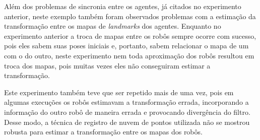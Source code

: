 Além dos problemas de sincronia entre os agentes, já citados no experimento 
anterior, neste exemplo também foram observados problemas com a estimação 
da transformação entre os mapas de \textit{landmarks} dos agentes. 
Enquanto no experimento anterior a troca de mapas entre os robôs sempre 
ocorre com sucesso, pois eles sabem suas poses iniciais e, portanto, sabem 
relacionar o mapa de um com o do outro, neste experimento nem toda aproximação dos 
robôs resultou em troca dos mapas, pois muitas vezes eles não conseguiram 
estimar a transformação.

Este experimento também teve que ser repetido mais de uma vez, pois em 
algumas execuções os robôs estimavam a transformação errada, incorporando 
a informação do outro robô de maneira errada e provocando divergência do 
filtro. Desse modo, a técnica de registro de nuvem de pontos utilizada 
não se mostrou robusta para estimar a transformação entre os mapas dos robôs.

